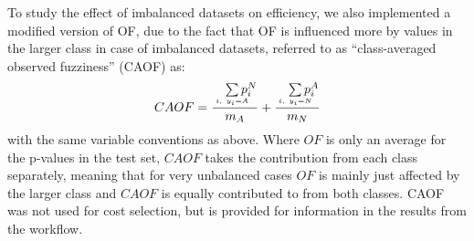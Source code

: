 \documentclass[utf8]{frontiersSCNS} %
\begin{document}
To study the effect of imbalanced datasets on efficiency, we also implemented a
modified version of OF, due to the fact that OF is influenced more
by values in the larger class in case of imbalanced datasets, referred to as
``class-averaged
observed fuzziness'' (CAOF) as:
\begin{equation}
CAOF = \frac
        {\quad\sum\limits_{\mathclap{\substack{\scriptscriptstyle i,\ y_i=A}}}p_i^N}
        {m_A}
       + \frac
        {\quad\sum\limits_{\mathclap{\substack{\scriptscriptstyle i,\ y_i=N}}}p_i^A}
        {m_N}
\end{equation}
with the same variable conventions as above. Where $OF$ is only an average for
the p-values in the test set, $CAOF$ takes the contribution from each class
separately, meaning that for very unbalanced cases $OF$ is mainly just affected
by the larger class and $CAOF$ is equally contributed to from both classes.
%
%
%
CAOF was not used for cost selection, but is provided for information in the
results from the workflow.
\end{document}
